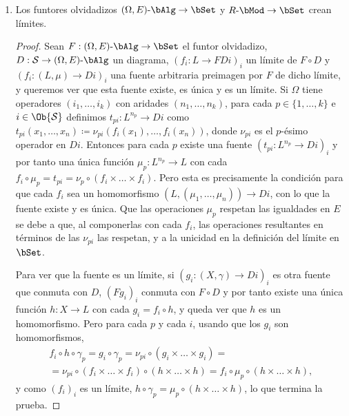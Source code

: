 \begin{example}\;
  \begin{enumerate}
  \item Los funtores olvidadizos $(\Omega,E)\dash\bAlg\to\bSet$ y
    $R\dash\bMod\to\bSet$ crean límites.
    \begin{proof}
      Sean $F:(\Omega,E)\dash\bAlg\to\bSet$ el funtor olvidadizo,
      $D:\cS\to(\Omega,E)\dash\bAlg$ un diagrama, $(f_i:L\to FDi)_i$ un límite
      de $F\circ D$ y $(f_i:(L,\mu)\to Di)_i$ una fuente arbitraria preimagen
      por $F$ de dicho límite, y queremos ver que esta fuente existe, es única y
      es un límite. Si $\Omega$ tiene operadores $(i_1,\dots,i_k)$ con aridades
      $(n_1,\dots,n_k)$, para cada $p\in\{1,\dots,k\}$ e $i\in\Ob{\cS}$
      definimos $t_{pi}:L^{n_p}\to Di$ como
      $t_{pi}(x_1,\dots,x_n)\coloneqq\nu_{pi}(f_i(x_1),\dots,f_i(x_n))$, donde
      $\nu_{pi}$ es el $p$-ésimo operador en $Di$. Entonces para cada $p$ existe
      una fuente $(t_{pi}:L^{n_p}\to Di)_i$ y por tanto una única función
      $\mu_p:L^{n_p}\to L$ con cada
      $f_i\circ\mu_p=t_{pi}=\nu_p\circ(f_i\times\dots\times f_i)$. Pero esta es
      precisamente la condición para que cada $f_i$ sea un homomorfismo
      $(L,(\mu_1,\dots,\mu_n))\to Di$, con lo que la fuente existe y es
      única. Que las operaciones $\mu_p$ respetan las igualdades en $E$ se debe
      a que, al componerlas con cada $f_i$, las operaciones resultantes en
      términos de las $\nu_{pi}$ las respetan, y a la unicidad en la definición
      del límite en $\bSet$.

      Para ver que la fuente es un límite, si $(g_i:(X,\gamma)\to Di)_i$ es otra
      fuente que conmuta con $D$, $(Fg_i)_i$ conmuta con $F\circ D$ y por tanto
      existe una única función $h:X\to L$ con cada $g_i=f_i\circ h$, y queda ver
      que $h$ es un homomorfismo. Pero para cada $p$ y cada $i$, usando que los
      $g_i$ son homomorfismos,
      \begin{multline*}
        f_i\circ h\circ\gamma_p = g_i\circ\gamma_p
        = \nu_{pi}\circ(g_i\times\dots\times g_i) = \\
        = \nu_{pi}\circ(f_i\times\dots\times f_i)\circ(h\times\dots\times h)
        = f_i\circ\mu_p\circ(h\times\dots\times h),
      \end{multline*}
      y como $(f_i)_i$ es un límite,
      $h\circ\gamma_p=\mu_p\circ(h\times\dots\times h)$, lo que termina la
      prueba.


\end{proof}
\end{enumerate}
\end{example}
